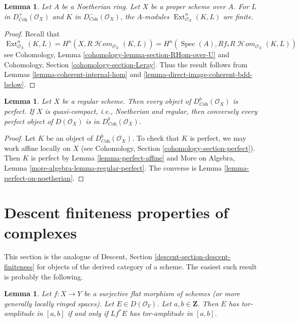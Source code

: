 \documentclass{stacks-project}
\theoremstyle{plain}
\newtheorem{lemma}[subsection]{Lemma}
\theoremstyle{definition}
\theoremstyle{remark}
\numberwithin{equation}{subsection}
\def\Spec{\mathop{\mathrm{Spec}}}
\def\Ext{\mathop{\mathrm{Ext}}\nolimits}
\def\SheafHom{\mathop{\mathcal{H}\!\mathit{om}}\nolimits}
\begin{document}
\begin{lemma}
\label{lemma-ext-finite}
Let $A$ be a Noetherian ring. Let $X$ be a proper scheme over $A$.
For $L$ in
$D^+_{\textit{Coh}}(\mathcal{O}_X)$ and $K$ in
$D^-_{\textit{Coh}}(\mathcal{O}_X)$, the $A$-modules
$\Ext_{\mathcal{O}_X}^n(K, L)$ are finite.
\end{lemma}

\begin{proof}
Recall that
$$
\Ext_{\mathcal{O}_X}^n(K, L) =
H^n(X, R\SheafHom_{\mathcal{O}_X}(K, L)) =
H^n(\Spec(A), Rf_*R\SheafHom_{\mathcal{O}_X}(K, L))
$$
see Cohomology, Lemma \ref{cohomology-lemma-section-RHom-over-U}
and Cohomology, Section \ref{cohomology-section-Leray}.
Thus the result follows from
Lemmas \ref{lemma-coherent-internal-hom} and
\ref{lemma-direct-image-coherent-bdd-below}.
\end{proof}

\begin{lemma}
\label{lemma-perfect-on-regular}
Let $X$ be a regular scheme. Then
every object of $D^b_{\textit{Coh}}(\mathcal{O}_X)$ is perfect.
If $X$ is quasi-compact, i.e., Noetherian and regular,
then conversely every perfect object of
$D(\mathcal{O}_X)$ is in $D^b_{\textit{Coh}}(\mathcal{O}_X)$.
\end{lemma}

\begin{proof}
Let $K$ be an object of $D^b_{\textit{Coh}}(\mathcal{O}_X)$.
To check that $K$ is perfect, we may work affine locally on $X$
(see Cohomology, Section \ref{cohomology-section-perfect}).
Then $K$ is perfect by Lemma \ref{lemma-perfect-affine} and
More on Algebra, Lemma \ref{more-algebra-lemma-regular-perfect}.
The converse is Lemma \ref{lemma-perfect-on-noetherian}.
\end{proof}




\section{Descent finiteness properties of complexes}
\label{section-descent-finiteness}

\noindent
This section is the analogue of
Descent, Section \ref{descent-section-descent-finiteness}
for objects of the derived category of a scheme.
The easiest such result is probably the following.

\begin{lemma}
\label{lemma-tor-amplitude-descends}
Let $f : X \to Y$ be a surjective flat morphism of schemes
(or more generally locally ringed spaces).
Let $E \in D(\mathcal{O}_Y)$. Let $a, b \in \mathbf{Z}$.
Then $E$ has tor-amplitude in $[a, b]$ if and only if
$Lf^*E$ has tor-amplitude in $[a, b]$.
\end{lemma}
\end{document}
